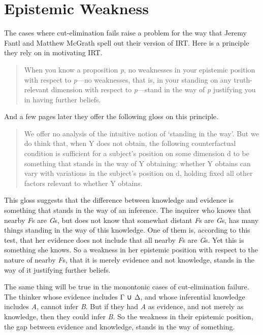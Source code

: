 \documentclass[
  11pt,
]{book}
\begin{document}
\hypertarget{weakness}{%
\section{Epistemic Weakness}\label{weakness}}

The cases where cut-elimination fails raise a problem for the way that Jeremy Fantl and Matthew McGrath spell out their version of IRT. Here is a principle they rely on in motivating IRT.

\begin{quote}
When you know a proposition \emph{p}, no weaknesses in your epistemic position with respect to \emph{p}---no weaknesses, that is, in your standing on any truth-relevant dimension with respect to \emph{p}---stand in the way of \emph{p} justifying you in having further beliefs. \citep[64]{FantlMcGrath2009}
\end{quote}

And a few pages later they offer the following gloss on this principle.

\begin{quote}
We offer no analysis of the intuitive notion of `standing in the way'. But we do think that, when Y does not obtain, the following counterfactual condition is sufficient for a subject's position on some dimension d to be something that stands in the way of Y obtaining: whether Y obtains can vary with variations in the subject's position on d, holding fixed all other factors relevant to whether Y obtains. \citep[67]{FantlMcGrath2009}
\end{quote}

This gloss suggests that the difference between knowledge and evidence is something that stands in the way of an inference. The inquirer who knows that nearby \emph{F}s are \emph{G}s, but does not know that somewhat distant \emph{F}s are \emph{G}s, has many things standing in the way of this knowledge. One of them is, according to this test, that her evidence does not include that all nearby \emph{F}s are \emph{G}s. Yet this is something she knows. So a weakness in her epistemic position with respect to the nature of nearby \emph{F}s, that it is merely evidence and not knowledge, stands in the way of it justifying further beliefs.

The same thing will be true in the monontonic cases of cut-elimination failure. The thinker whose evidence includes Γ ∪ Δ, and whose inferential knowledge includes \emph{A}, cannot infer \emph{B}. But if they had \emph{A} as evidence, and not merely as knowledge, then they could infer \emph{B}. So the weakness in their epistemic position, the gap between evidence and knowledge, stands in the way of something.
\end{document}
